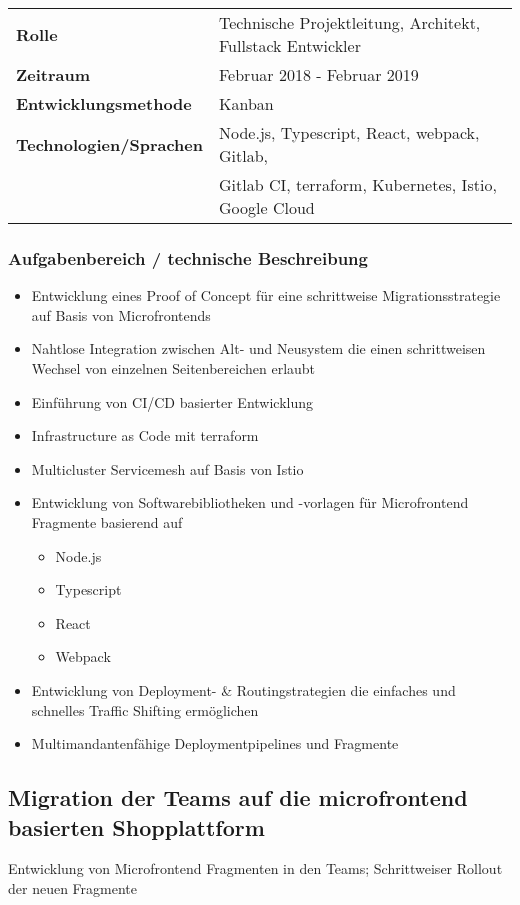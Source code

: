 \documentclass[10pt,ngerman,a4paper]{article}
\begin{document}
\begin{tabular}{ll}
\textbf{Rolle} & Technische Projektleitung, Architekt, Fullstack Entwickler\\
\textbf{Zeitraum} & Februar 2018 - Februar 2019\\
\textbf{Entwicklungsmethode} & Kanban\\
\textbf{Technologien/Sprachen} & Node.js, Typescript, React, webpack, Gitlab,\\
& Gitlab CI, terraform, Kubernetes, Istio, Google Cloud
\end{tabular}

\subsubsection{Aufgabenbereich / technische Beschreibung}
\begin{itemize}
\item Entwicklung eines Proof of Concept für eine schrittweise Migrationsstrategie auf Basis von Microfrontends
\item Nahtlose Integration zwischen Alt- und Neusystem die einen schrittweisen Wechsel von einzelnen Seitenbereichen erlaubt
\item Einführung von CI/CD basierter Entwicklung
\item Infrastructure as Code mit terraform
\item Multicluster Servicemesh auf Basis von Istio
\item Entwicklung von Softwarebibliotheken und -vorlagen für Microfrontend Fragmente basierend auf
\begin{itemize}
\item Node.js
\item Typescript
\item React
\item Webpack
\end{itemize}
\item Entwicklung von Deployment- \& Routingstrategien die einfaches und schnelles Traffic Shifting ermöglichen
\item Multimandantenfähige Deploymentpipelines und Fragmente
\end{itemize}

\subsection{Migration der Teams auf die microfrontend basierten Shopplattform}
Entwicklung von Microfrontend Fragmenten in den Teams; Schrittweiser Rollout 
der neuen Fragmente
\end{document}
